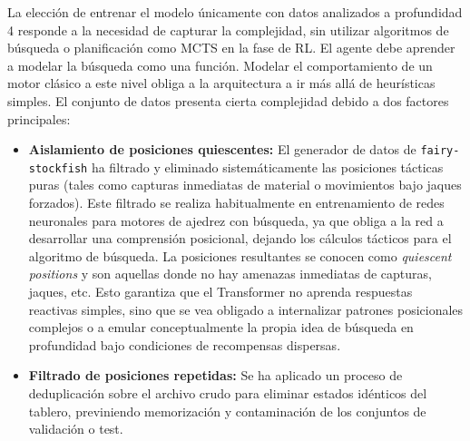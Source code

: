 \documentclass[12pt, a4paper]{article}
\begin{document}
La elección de entrenar el modelo únicamente con datos analizados a profundidad 4 responde a la necesidad de capturar la complejidad, sin utilizar algoritmos de búsqueda o planificación como MCTS en la fase de RL. El agente debe aprender a modelar la búsqueda como una función. Modelar el comportamiento de un motor clásico a este nivel obliga a la arquitectura a ir más allá de heurísticas simples. El conjunto de datos presenta cierta complejidad debido a dos factores principales:

\begin{itemize}
    \item \textbf{Aislamiento de posiciones quiescentes:} El generador de datos de \texttt{fairy-stockfish} ha filtrado y eliminado sistemáticamente las posiciones tácticas puras (tales como capturas inmediatas de material o movimientos bajo jaques forzados). Este filtrado se realiza habitualmente en entrenamiento de redes neuronales para motores de ajedrez con búsqueda, ya que obliga a la red a desarrollar una comprensión posicional, dejando los cálculos tácticos para el algoritmo de búsqueda. La posiciones resultantes se conocen como \textit{quiescent positions} y son aquellas donde no hay amenazas inmediatas de capturas, jaques, etc.
    Esto garantiza que el Transformer no aprenda respuestas reactivas simples, sino que se vea obligado a internalizar patrones posicionales complejos o a emular conceptualmente la propia idea de búsqueda en profundidad bajo condiciones de recompensas dispersas.
    \item \textbf{Filtrado de posiciones repetidas:} Se ha aplicado un proceso de deduplicación sobre el archivo crudo para eliminar estados idénticos del tablero, previniendo memorización y contaminación de los conjuntos de validación o test.
\end{itemize}
\end{document}
